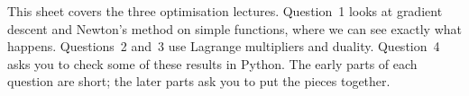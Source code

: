 \documentclass{sotonExamBoxes}    %
\begin{document}

\maketitle

This sheet covers the three optimisation lectures.  Question~1 looks
at gradient descent and Newton's method on simple functions, where we
can see exactly what happens.  Questions~2 and~3 use Lagrange
multipliers and duality.  Question~4 asks you to check some of these
results in Python.  The early parts of each question are short; the
later parts ask you to put the pieces together.

\end{document}
